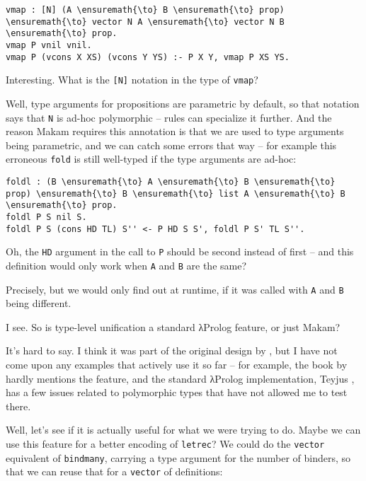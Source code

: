 \begin{verbatim}
vmap : [N] (A \ensuremath{\to} B \ensuremath{\to} prop) \ensuremath{\to} vector N A \ensuremath{\to} vector N B \ensuremath{\to} prop.
vmap P vnil vnil.
vmap P (vcons X XS) (vcons Y YS) :- P X Y, vmap P XS YS.
\end{verbatim}

\heroSTUDENT{} Interesting. What is the \texttt{{[}N{]}} notation in the type
of \texttt{vmap}?

\heroADVISOR{} Well, type arguments for propositions are parametric by
default, so that notation says that \texttt{N} is ad-hoc polymorphic --
rules can specialize it further. And the reason Makam requires this
annotation is that we are used to type arguments being parametric, and
we can catch some errors that way -- for example this erroneous
\texttt{fold} is still well-typed if the type arguments are ad-hoc:

\begin{verbatim}
foldl : (B \ensuremath{\to} A \ensuremath{\to} B \ensuremath{\to} prop) \ensuremath{\to} B \ensuremath{\to} list A \ensuremath{\to} B \ensuremath{\to} prop.
foldl P S nil S.
foldl P S (cons HD TL) S'' <- P HD S S', foldl P S' TL S''.
\end{verbatim}

\heroSTUDENT{} Oh, the \texttt{HD} argument in the call to \texttt{P} should
be second instead of first -- and this definition would only work when
\texttt{A} and \texttt{B} are the same?

\heroADVISOR{} Precisely, but we would only find out at runtime, if it was
called with \texttt{A} and \texttt{B} being different.

\heroSTUDENT{} I see. So is type-level unification a standard \foreignlanguage{greek}{λ}Prolog feature,
or just Makam?

\heroADVISOR{} It's hard to say. I think it was part of the original design by
\citet{miller1988overview}, but I have not come upon any examples that
actively use it so far -- for example, the book by
\citet{miller2012programming} hardly mentions the feature, and the
standard \foreignlanguage{greek}{λ}Prolog implementation, Teyjus \citep{nadathur1999system}, has
a few issues related to polymorphic types that have not allowed me to
test there.

\heroSTUDENT{} Well, let's see if it is actually useful for what we were
trying to do. Maybe we can use this feature for a better encoding of
\texttt{letrec}? We could do the \texttt{vector} equivalent of
\texttt{bindmany}, carrying a type argument for the number of binders,
so that we can reuse that for a \texttt{vector} of definitions:

